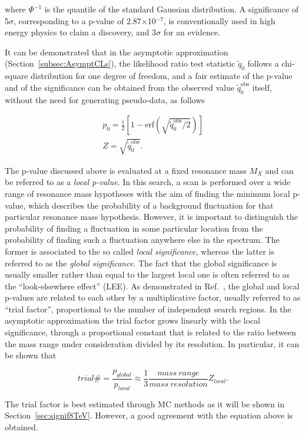 \noindent where $\Phi^{-1}$ is the quantile of the standard Gaussian distribution.
A significance of 5$\sigma$, corresponding to a p-value of 2.87$\times$10$^{-7}$, is conventionally used in high energy physics to claim a discovery,
and 3$\sigma$ for an evidence.

It can be demonstrated that in the asymptotic approximation (Section~\ref{subsec:AsymptCLs}), the likelihood ratio test statistic $\tilde{q}_0$
follows a chi-square distribution for one degree of freedom, and a fair estimate of the p-value and of the significance can be obtained from the observed value $\tilde{q}_0^\mathrm{obs}$ itself,
without the need for generating pseudo-data, as follows

\begin{equation}
\begin{gathered}
p_0 = \frac{1}{2} [ 1 - \mathrm{erf}(\sqrt{\tilde{q}_0^\mathrm{obs}/2}) ] \\
Z = \sqrt{\tilde{q}_0^\mathrm{obs}}.
\end{gathered}
\end{equation}

The p-value discussed above is evaluated at a fixed resonance mass $M_X$ and can be referred to as a \textit{local p-value}.
In this search, a scan is performed over a wide range of resonance mass hypotheses with the aim of finding
the minimum local p-value, which describes the probability of a background fluctuation for that particular resonance mass hypothesis.
However, it is important to distinguish the probability of finding a fluctuation in some particular location from the probability of finding such a fluctuation anywhere else in the spectrum.
The former is associated to the so called \textit{local significance}, whereas the latter is referred to as the \textit{global significance}.
The fact that the global significance is usually smaller rather than equal to the largest local one is often referred to as the ``look-elsewhere effect'' (LEE).
As demonstrated in Ref.~\cite{Gross:2010qma}, the global and local p-values are related to each other by a multiplicative factor, usually referred to as ``trial factor'', proportional to the number of independent search regions.
In the asymptotic approximation the trial factor grows linearly with the local significance, through a proportional constant
that is related to the ratio between the mass range under consideration divided by its resolution. In particular, it can be shown that

\begin{equation}\label{eqn:trials}
trial\# = \frac{p_{global}}{p_{local}} \approx \frac{1}{3}\frac{mass\ range}{mass\ resolution}Z_{local}.
\end{equation}

The trial factor is best estimated through MC methods as it will be shown in Section~\ref{sec:signif8TeV}. However, a good agreement with the equation above is obtained.
